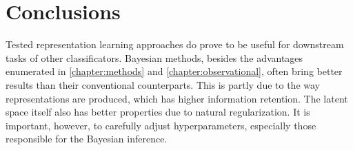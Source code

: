 






\section{Conclusions}
Tested representation learning approaches do prove to be useful for downstream tasks of other classificators. Bayesian methods, besides the advantages enumerated in \autoref{chapter:methods} and \autoref{chapter:observational}, often bring better results than their conventional counterparts. This is partly due to the way representations are produced, which has higher information retention. The latent space itself also has better properties due to natural regularization. It is important, however, to carefully adjust hyperparameters, especially those responsible for the Bayesian inference.